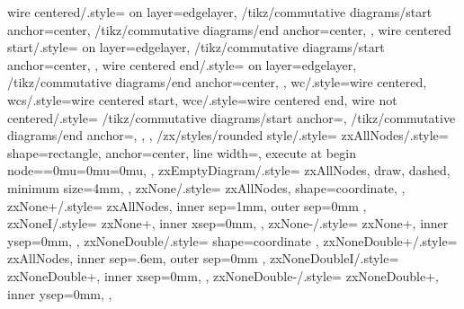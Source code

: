 {{    wire centered/.style={
      on layer=edgelayer,
      /tikz/commutative diagrams/start anchor=center,
      /tikz/commutative diagrams/end anchor=center,
    },
    wire centered start/.style={
      on layer=edgelayer,
      /tikz/commutative diagrams/start anchor=center,
    },
    wire centered end/.style={
      on layer=edgelayer,
      /tikz/commutative diagrams/end anchor=center,
    },
    wc/.style={wire centered},
    wcs/.style={wire centered start},
    wce/.style={wire centered end},
    wire not centered/.style={
      /tikz/commutative diagrams/start anchor=,
      /tikz/commutative diagrams/end anchor=,
    },
  },
  /zx/styles/rounded style/.style={
    zxAllNodes/.style={
      shape=rectangle, %
      anchor=center,   %
      line width=\zxDefaultLineWidth,
      execute at begin node={\thinmuskip=0mu\medmuskip=0mu\thickmuskip=0mu}, %
    },
    zxEmptyDiagram/.style={
      zxAllNodes,
      draw,
      dashed,
      minimum size=4mm,
    },
    zxNone/.style={
      zxAllNodes,
      shape=coordinate, %
    },
    zxNone+/.style={
      zxAllNodes,
      inner sep=1mm,
      outer sep=0mm
    },
    zxNoneI/.style={
      zxNone+,
      inner xsep=0mm,
    },
    zxNone-/.style={
      zxNone+,
      inner ysep=0mm,
    },
    zxNoneDouble/.style={
      shape=coordinate
    },
    zxNoneDouble+/.style={
      zxAllNodes,
      inner sep=.6em,
      outer sep=0mm
    },
    zxNoneDoubleI/.style={
      zxNoneDouble+,
      inner xsep=0mm,
    },
    zxNoneDouble-/.style={
      zxNoneDouble+,
      inner ysep=0mm,
    },
}}
